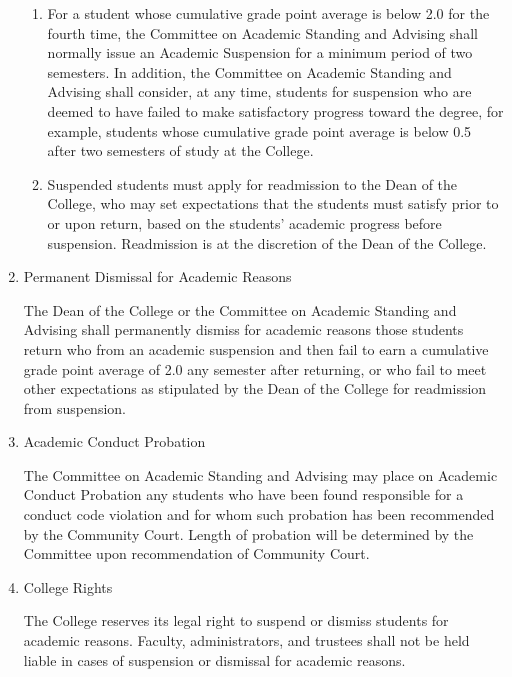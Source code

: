 \documentclass{manual}
\newcommand{\itemLevelA}{\alph*.}
\newcommand{\itemLevelB}{\arabic*)}
\newcommand{\itemRefA}{\alph*}
\newcommand{\itemRefB}{\arabic*}
\begin{document}
\begin{enumerate}[label=\itemLevelA,ref=\itemRefA]
					\begin{enumerate}[label=\itemLevelB,ref=\itemRefB]
					\item For a student whose cumulative grade point average is below 2.0 for the fourth time, the Committee on Academic Standing and Advising shall normally issue an Academic Suspension for a minimum period of two semesters. In addition, the Committee on Academic Standing and Advising shall consider, at any time, students for suspension who are deemed to have failed to make satisfactory progress toward the degree, for example, students whose cumulative grade point average is below 0.5 after two semesters of study at the College. 
					\item Suspended students must apply for readmission to the Dean of the College, who may set expectations that the students must satisfy prior to or upon return, based on the students' academic progress before suspension. Readmission is at the discretion of the Dean of the College.
					\end{enumerate}
				
				\item Permanent Dismissal for Academic Reasons       

					The Dean of the College or the Committee on Academic Standing and Advising shall permanently dismiss for academic reasons those students return who from an academic suspension and then fail to earn a cumulative grade point average of 2.0 any semester after returning, or who fail to meet other expectations as stipulated by the Dean of the College for readmission from suspension. 
				
				\item Academic Conduct Probation

					The Committee on Academic Standing and Advising may place on Academic Conduct Probation any students who have been found responsible for a conduct code violation and for whom such probation has been recommended by the Community Court. Length of probation will be determined by the Committee upon recommendation of Community Court.
				
				\item College Rights

					The College reserves its legal right to suspend or dismiss students for academic reasons. Faculty, administrators, and trustees shall not be held liable in cases of suspension or dismissal for academic reasons.
				
				\end{enumerate}
\end{document}
